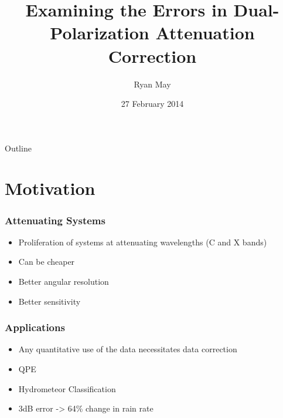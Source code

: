 \documentclass[red]{beamer}
\title{Examining the Errors in Dual-Polarization Attenuation Correction}
\author{Ryan May}
\date{27 February 2014}
\begin{document}
\begin{frame}
\titlepage
\end{frame}

\section[Outline]{}
\begin{frame}{Outline}
    \tableofcontents
\end{frame}

\section{Motivation}
\begin{frame}
	\frametitle{Attenuating Systems}
	\begin{itemize}
		\item Proliferation of systems at attenuating wavelengths (C and X bands)
		\item Can be cheaper
		\item Better angular resolution
		\item Better sensitivity
	\end{itemize}
\end{frame}

\begin{frame}
	\frametitle{Applications}
	\begin{itemize}
		\item Any quantitative use of the data necessitates data correction
		\item QPE
		\item Hydrometeor Classification
		\item 3dB error -> 64\% change in rain rate
	\end{itemize}
\end{frame}
\end{document}
